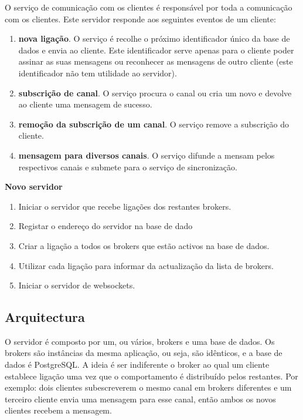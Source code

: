 O serviço de comunicação com os clientes é responsável por toda a comunicação com os clientes. Este servidor responde aos seguintes eventos de um cliente:
\begin{enumerate}
\item \textbf{nova ligação}. O serviço é recolhe o próximo identificador único da base de dados e envia ao cliente. Este identificador serve apenas para o cliente poder assinar as suas mensagens ou reconhecer as mensagens de outro cliente (este identificador não tem utilidade ao servidor).
\item \textbf{subscrição de canal}. O serviço procura o canal ou cria um novo e devolve ao cliente uma mensagem de sucesso.
\item \textbf{remoção da subscrição de um canal}. O serviço remove a subscrição do cliente.
\item \textbf{mensagem para diversos canais}. O serviço difunde a mensam pelos respectivos canais e submete para o serviço de sincronização.
\end{enumerate}

\hl{}

\textbf{Novo servidor}
\begin{enumerate}
\item Iniciar o servidor que recebe ligações dos restantes brokers.
\item Registar o endereço do servidor na base de dado
\item Criar a ligação a todos os brokers que estão activos na base de dados.
\item Utilizar cada ligação para informar da actualização da lista de brokers.
\item Iniciar o servidor de websockets.
\end{enumerate}



\subsection{Arquitectura}

O servidor é composto por um, ou vários, brokers e uma base de dados. Os brokers são instâncias da mesma aplicação, ou seja, são idênticos, e a base de dados é PostgreSQL. A ideia é ser indiferente o broker ao qual um cliente establece ligação uma vez que o comportamento é distribuído pelos restantes.
Por exemplo: dois clientes subescreverem o mesmo canal em brokers diferentes e um terceiro cliente envia uma mensagem para esse canal, então ambos os novos clientes recebem a mensagem.


